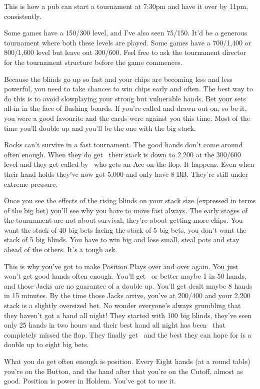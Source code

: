 This is how a pub can start a tournament at 7:30pm and have it over
by 11pm, consistently.

Some games have a 150/300 level, and I've also seen 75/150. It'd be
a generous tournament where both these levels are played. Some games
have a 700/1,400 or 800/1,600 level but leave out 300/600. Feel
free to ask the tournament director for the tournament structure before
the game commences.

Because the blinds go up so fast and your chips are becoming less and
less powerful, you need to take chances to win chips early and often.
The best way to do this is to avoid slowplaying your strong but
vulnerable hands. Bet your sets all-in in the face of flushing boards.
If you're called and drawn out on, so be it, you were a good favourite
and the cards were against you this time. Most of the time you'll double
up and you'll be the one with the big stack.

Rocks can't survive in a fast tournament. The good hands don't come
around often enough. When they do get \Ks\Kc\ their stack is down to 2,200 at
the 300/600 level and they get called by \Ad\Qd\ who gets an Ace on the flop.
It happens. Even when their hand holds they've now got 5,000 and only have
8 BB. They're still under extreme pressure.

Once you see the effects of the rising blinds on your stack size
(expressed in terms of the big bet) you'll see why you have to move
fast always. The early stages of the tournament are not about survival,
they're about getting more chips. You want the stack of 40 big bets facing
the stack of 5 big bets, you don't want the stack of 5 big blinds. You
have to win big and lose small, steal pots and stay ahead of the others.
It's a tough ask.

This is why you've got to make Position Plays over and over again.
You just won't get good hands often enough. You'll get \Js\Jc\ or better
maybe 1 in 50 hands, and those Jacks are no guarantee of a double up.
You'll get dealt maybe 8 hands in 15 minutes.
By the time those Jacks arrive, you've at 200/400 and your 2,200 stack is
a slightly oversized bet. No wonder everyone's always grumbling that
they haven't got a hand all night! They started with 100 big blinds,
they've seen only 25 hands in two hours and their best hand all
night has been \Jd\nined\ that completely missed the flop.
They finally get \Js\Jc\ and the best they can hope for is a double
up to eight big bets.

What you do get often enough is position. Every Eight hands (at a
round table) you're on the Button, and the hand after that you're on
the Cutoff, almost as good. Position is power in Holdem. You've got to
use it.

